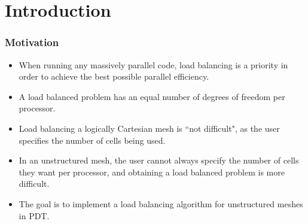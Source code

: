 \documentclass[compress]{beamer}
\begin{document}
\begin{frame}
\tableofcontents
\end{frame}

\section{Introduction}
\begin{frame}[t]\frametitle{Motivation}
	\begin{block}{}
	\begin{itemize}
		\item When running any massively parallel code, load balancing is a priority in order to achieve the best possible parallel efficiency.
		\item  A load balanced problem has an equal number of degrees of freedom per processor.
		\item Load balancing a logically Cartesian mesh is ``not difficult", as the user specifies the number of cells being used.
		\item In an unstructured mesh, the user cannot always specify the number of cells they want per processor, and obtaining a load balanced problem is more difficult.
		\item The goal is to implement a load balancing algorithm for unstructured meshes in PDT.
	\end{itemize}
	\end{block}
\end{frame}
\end{document}

